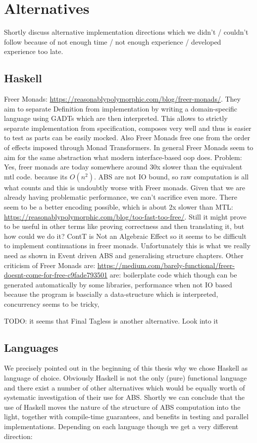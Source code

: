 \section{Alternatives}
\label{sec:alternatives}

Shortly discuss alternative implementation directions which we didn't / couldn't follow because of not enough time / not enough experience / developed experience too late. 

\subsection{Haskell}
Freer Monads: \url{https://reasonablypolymorphic.com/blog/freer-monads/}. They aim to separate Definition from implementation by writing a domain-specific language using GADTs which are then interpreted. This allows to strictly separate implementation from specification, composes very well and thus is easier to test as parts can be easily mocked. Also Freer Monads free one from the order of effects imposed through Monad Transformers. In general Freer Monads seem to aim for the same abstraction what modern interface-based oop does.
Problem: Yes, freer monads are today somewhere around 30x slower than the equivalent mtl code. because its $O(n^2)$. ABS are not IO bound, so raw computation is all what counts and this is undoubtly worse with Freer monads. Given that we are already having problematic performance, we can't sacrifice even more. There seem to be a better encoding possible, which is about 2x slower than MTL: \url{https://reasonablypolymorphic.com/blog/too-fast-too-free/}. Still it might prove to be useful in other terms like proving correctness and then translating it, but how could we do it?  
ContT is Not an Algebraic Effect so it seems to be difficult to implement continuations in freer monads. Unfortunately this is what we really need as shown in Event driven ABS and generalising structure chapters.
Other criticism of Freer Monads are: \url{https://medium.com/barely-functional/freer-doesnt-come-for-free-c9fade793501} are: boilerplate code which though can be generated automatically by some libraries, performance when not IO based because the program is bascially a data-structure which is interpreted, concurrency seems to be tricky, 

TODO: it seems that Final Tagless is another alternative. Look into it

\subsection{Languages}
We precisely pointed out in the beginning of this thesis why we chose Haskell as language of choice. Obviously Haskell is not the only (pure) functional language and there exist a number of other alternatives which would be equally worth of systematic investigation of their use for ABS. Shortly we can conclude that the use of Haskell moves the nature of the structure of ABS computation into the light, together with compile-time guarantees, and benefits in testing and parallel implementations. Depending on each language though we get a very different direction:

